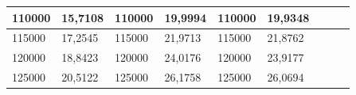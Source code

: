 \documentclass[11pt,openany]{book}
\begin{document}
\begin{table}[!ht]
\begin{tabular}{|l|l|l|l|l|l|l|l|}
        110000                                            & 15,7108                                            & 110000                                              & 19,9994                                             & 110000          & 19,9348         & ~               & ~               \\ \hline
        115000                                            & 17,2545                                            & 115000                                              & 21,9713                                             & 115000          & 21,8762         & ~               & ~               \\ \hline
        120000                                            & 18,8423                                            & 120000                                              & 24,0176                                             & 120000          & 23,9177         & ~               & ~               \\ \hline
        125000                                            & 20,5122                                            & 125000                                              & 26,1758                                             & 125000          & 26,0694         & ~               &                 \\\hline
    \end{tabular}
\end{table}
\end{document}
